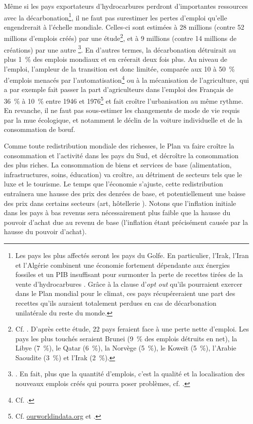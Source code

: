 \documentclass[a5paper,french]{memoir}
\begin{document}
Même si les pays exportateurs d'hydrocarbures perdront d'importantes ressources avec la décarbonation\footnote{Les pays les plus affectés seront les pays du Golfe. En particulier, l'Irak, l'Iran et l'Algérie combinent une économie fortement dépendante aux énergies fossiles et un PIB insuffisant pour surmonter la perte de recettes tirées de la vente d'hydrocarbures \citep{muttitt_equity_2020}. Grâce à la clause d'\textit{opt out} qu'ils pourraient exercer dans le Plan mondial pour le climat, ces pays récupéreraient une part des recettes qu'ils auraient totalement perdues en cas de décarbonation unilatérale du reste du monde.}, il ne faut pas surestimer les pertes d'emploi qu'elle engendrerait à l'échelle mondiale. Celles-ci sont estimées à 28 millions (contre 52 millions d'emplois créés) par une étude\footnote{Cf. \cite{jacobson_100_2017}. D'après cette étude, 22 pays feraient face à une perte nette d'emploi. Les pays les plus touchés seraient Brunei (9~\% des emplois détruits en net), la Libye (7~\%), le Qatar (6~\%), la Norvège (5~\%), le Koweït (5~\%), l'Arabie Saoudite (3~\%) et l'Irak (2~\%).}, et à 9 millions (contre 14 millions de créations) par une autre
\footnote{\cite{pai_meeting_2021}. En fait, plus que la quantité d'emplois, c'est la qualité et la localisation des nouveaux emplois créés qui pourra poser problèmes, cf. \cite{haywood_welfare_2021}.}. En d'autres termes, la décarbonation détruirait au plus 1~\% des emplois mondiaux et en créerait deux fois plus. Au niveau de l'emploi, l'ampleur de la transition est donc limitée, comparée aux 10 à 50~\% d'emplois menacés par l'automatisation\footnote{Cf. \cite{frey_future_2017,lassebie_what_2022,hatzius_global_2023}.} ou à la mécanisation de l'agriculture, qui a par exemple fait passer la part d'agriculteurs dans l'emploi des Français de 36~\% à 10~\% entre 1946 et 1976\footnote{Cf. \href{https://ourworldindata.org/grapher/urbanization-last-500-years?country=~FRA}{ourworldindata.org} et \href{https://ourworldindata.org/grapher/share-of-the-labor-force-employed-in-agriculture?tab=chart&time=1800..latest&country=FRA}{\cite{herrendorf_chapter_2014}}.} et fait croître l'urbanisation au même rythme. En revanche, il ne faut pas sous-estimer les changements de mode de vie requis par la mue écologique, et notamment le déclin de la voiture individuelle et de la consommation de bœuf.

Comme toute redistribution mondiale des richesses, le Plan va faire croître la consommation et l'activité dans les pays du Sud, et décroître la consommation des plus riches. La consommation de biens et services de base (alimentation, infrastructures, soins, éducation) va croître, au détriment de secteurs tels que le luxe et le tourisme. Le temps que l'économie s'ajuste, cette redistribution entraînera une hausse des prix des denrées de base, et potentiellement une baisse des prix dans certains secteurs (art, hôtellerie%
). 
Notons que l'inflation initiale dans les pays à bas revenus sera nécessairement plus faible que la hausse du pouvoir d'achat due au revenu de base (l'inflation étant précisément causée par la hausse du pouvoir d'achat). 
\end{document}
